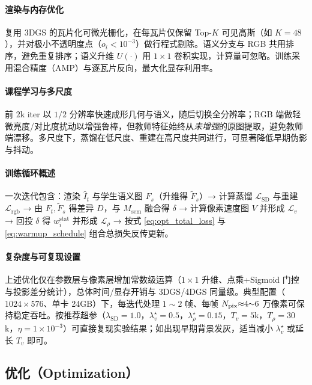 \documentclass[10pt,conference]{IEEEtran} %
\begin{document}
\paragraph{渲染与内存优化}
复用 3DGS 的瓦片化可微光栅化，在每瓦片仅保留 Top-$K$ 可见高斯（如 $K{=}48$），并对极小不透明度点（$o_i{<}10^{-3}$）做行程式剔除。语义分支与 RGB 共用排序，避免重复排序；语义升维 $U(\cdot)$ 用 $1{\times}1$ 卷积实现，计算量可忽略。训练采用混合精度（AMP）与逐瓦片反向，最大化显存利用率。

\paragraph{课程学习与多尺度}
前 $2$k iter 以 $1/2$ 分辨率快速成形几何与语义，随后切换全分辨率；RGB 端做轻微亮度/对比度扰动以增强鲁棒，但教师特征始终从\emph{未增强}的原图提取，避免教师端漂移。多尺度下，蒸馏在低尺度、重建在高尺度共同进行，可显著降低早期伪影与抖动。

\paragraph{训练循环概述}
一次迭代包含：渲染 $\hat I_t$ 与学生语义图 $F_s$（升维得 $\tilde F_s$）→ 计算蒸馏 $\mathcal L_{\mathrm{SD}}$ 与重建 $\mathcal L_{\mathrm{rgb}}$ → 由 $F_t,\tilde F_s$ 得差异 $D$，与 $M_{\mathrm{sem}}$ 融合得 $\delta$ → 计算像素速度图 $V$ 并形成 $\mathcal L_v$ → 回投 $\delta$ 得 $w_i^{\mathrm{stat}}$ 并形成 $\mathcal L_\rho$ → 按式 \eqref{eq:opt_total_loss} 与 \eqref{eq:warmup_schedule} 组合总损失反传更新。

\paragraph{复杂度与可复现设置}
上述优化仅在参数层与像素层增加常数级运算（$1{\times}1$ 升维、点乘+Sigmoid 门控与投影差分统计），总体时间/显存开销与 3DGS/4DGS 同量级。典型配置（$1024{\times}576$、单卡 24GB）下，每迭代处理 $1{\sim}2$ 帧、每帧 $N_{\rm pix}{\approx}4{\sim}6$ 万像素可保持稳定吞吐。按推荐超参（$\lambda_{\mathrm{SD}}{=}1.0$，$\lambda_v^\star{=}0.5$，$\lambda_\rho^\star{=}0.15$，$T_v{=}5$k，$T_\rho{=}30$k，$\eta{=}1\!\times\!10^{-3}$）可直接复现实验结果；如出现早期背景发灰，适当减小 $\lambda_v^\star$ 或延长 $T_v$ 即可。


\subsection{优化（Optimization）}
\end{document}
